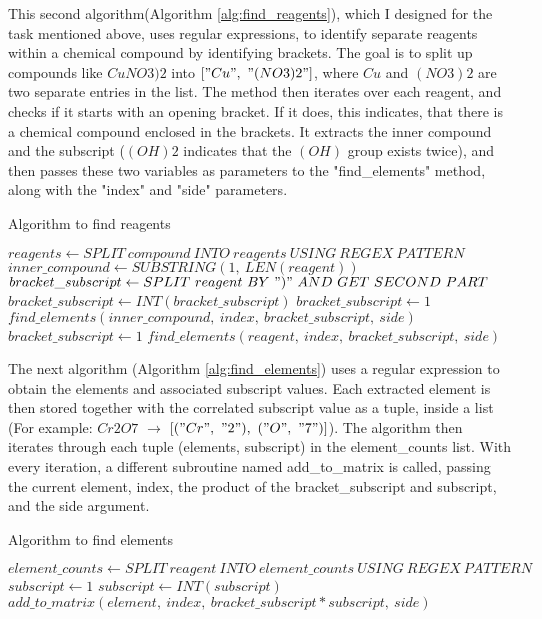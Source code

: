 \documentclass[a4paper,12pt]{article}
\begin{document}
This second algorithm(Algorithm \ref{alg:find_reagents}), which I designed for the task mentioned above, uses regular expressions, to identify separate reagents within a chemical compound by identifying brackets. The goal is to split up compounds like $ CuNO3)2$ into $ ["Cu",\ "(NO3)2"]$, where $Cu$ and $(NO3)2$ are two separate entries in the list. The method then iterates over each reagent, and checks if it starts with an opening bracket. If it does, this indicates, that there is a chemical compound enclosed in the brackets. It extracts the inner compound and the subscript ($ (OH)2$ indicates that the $(OH)$ group exists twice), and then passes these two variables as parameters to the "find\_elements" method, along with the "index" and "side" parameters.

\begin{algorithm}
\footnotesize
\caption{Algorithm to find reagents}\label{alg:find_reagents}
\begin{algorithmic}
\State $ reagents \gets SPLIT\ compound\ INTO\ reagents\ USING\ REGEX\ PATTERN$
	\State $ inner\_compound \gets SUBSTRING(1,\ LEN(reagent))$
	\State $ bracket\_subscript \gets SPLIT\ reagent\ BY\ ")"\ AND\ GET\ SECOND\ PART$
		\State $ bracket\_subscript \gets INT(bracket\_subscript)$
	\Else
		\State $ bracket\_subscript \gets 1$
	\EndIf
	\State $ find\_elements(inner\_compound,\ index,\ bracket\_subscript,\ side)$
\Else
	\State $ bracket\_subscript \gets 1$
	\State $ find\_elements(reagent,\ index,\ bracket\_subscript,\ side)$
\EndIf
\EndFor
\EndFunction
\end{algorithmic}
\end{algorithm}

The next algorithm (Algorithm \ref{alg:find_elements}) uses a regular expression to obtain the elements and associated subscript values. Each extracted element is then stored together with the correlated subscript value as a tuple, inside a list (For example: $Cr2O7$ $\rightarrow$ $[("Cr",\ "2"),\ ("O",\ "7")]$). The algorithm then iterates through each tuple (elements, subscript) in the element\_counts list.
With every iteration, a different subroutine named add\_to\_matrix is called, passing the current element, index, the product of the bracket\_subscript and subscript, and the side argument.

\newpage

\begin{algorithm}
\footnotesize
\caption{Algorithm to find elements}\label{alg:find_elements}
\begin{algorithmic}
\State $ element\_counts \gets SPLIT\ reagent\ INTO\ element\_counts\ USING\ REGEX\ PATTERN$
	\State $ subscript \gets 1$
\Else
	\State $ subscript \gets INT(subscript)$
\EndIf
\State $ add\_to\_matrix(element,\ index,\ bracket\_subscript * subscript,\ side)$
\EndFor
\EndFunction
\end{algorithmic}
\end{algorithm}
\end{document}
